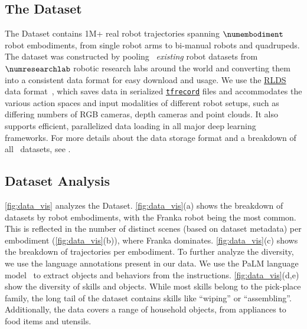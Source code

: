 \subsection{The \repo Dataset}
\vspace{-0.1em}

The \repo Dataset contains 1M+ real robot trajectories spanning $\numembodiment$ robot embodiments, from single robot arms to bi-manual robots and quadrupeds. The dataset was constructed by pooling \numdatasets~\emph{existing} robot datasets from $\numresearchlab$ robotic research labs around the world and converting them into a consistent data format for easy download and usage.
We use the \href{https://github.com/google-research/rlds}{RLDS} data format~\cite{ramos2021rlds}, which saves data in serialized \href{https://www.tensorflow.org/tutorials/load_data/tfrecord}{\texttt{tfrecord}} files and accommodates the various action spaces and input modalities of different robot setups, such as differing numbers of RGB cameras, depth cameras and point clouds. It also supports efficient, parallelized data loading in all major deep learning frameworks. For more details about the data storage format and a breakdown of all \numdatasets~datasets, see \repourl.

\vspace{-0.25em}
\subsection{Dataset Analysis}
\vspace{-0.2em}

\cref{fig:data_vis} analyzes the \repo Dataset. %
\cref{fig:data_vis}(a) shows the breakdown of datasets by robot embodiments, with the Franka robot being the most common. This is reflected in the number of distinct scenes (based on dataset metadata) per embodiment (\cref{fig:data_vis}(b)), where Franka dominates. 
\cref{fig:data_vis}(c) shows the breakdown of trajectories per embodiment. 
To further analyze the diversity, we use the language annotations present in our data. We use the PaLM language model~\citep{anil2023palm} to extract objects and behaviors from the instructions. \cref{fig:data_vis}(d,e) show the diversity of skills and objects. While most skills belong to the pick-place family, the long tail of the dataset contains skills like ``wiping'' or ``assembling''. Additionally, the data covers a range of household objects, from appliances to food items and utensils. 

\vspace{-0.2em}
